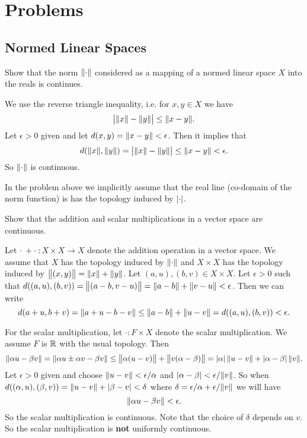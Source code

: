 \section{Problems}
\subsection{Normed Linear Spaces}
\begin{problem}
	Show that the norm $ \norm{\cdot} $ considered as a mapping of a normed linear space $ X $ into the reals is continues.
\end{problem}

\begin{solution}
	We use the reverse triangle inequality, i.e. for $ x,y \in X $ we have
	\[ \left|\norm{x} - \norm{y}\right| \leq \norm{x-y}. \]
	Let $ \epsilon>0 $ given and let $ d(x,y)=\norm{x-y}<\epsilon $. Then it implies that
	\[ d(\norm{x},\norm{y}) = \left|\norm{x} - \norm{y}\right| \leq \norm{x-y} <\epsilon. \]
	So $ \norm{\cdot} $ is continuous.
\end{solution}
\begin{remark}
	In the problem above we implicitly assume that the real line (co-domain of the norm function) is has the topology induced by $ \left|\cdot\right| $.
\end{remark}

\begin{problem}
	Show that the addition and scalar multiplications in a vector space are continuous.
\end{problem}
\begin{solution}
	Let $ \cdot\ + \cdot\ : X\times X \to X $ denote the addition operation in a vector space. We assume that $ X $ has the topology induced by $ \norm{\cdot} $ and $ X\times X $ has the topology induced by $ \norm{(x,y)} = \norm{x} + \norm{y} $. Let $ (a,u),(b,v)\in X\times X $. Let $ \epsilon>0 $ such that $ d((a,u),(b,v)) = \norm{(a-b,v-u)} = \norm{a-b} + \norm{v-u} < \epsilon $. Then we can write
	\[ d(a+u,b+v) = \norm{a+u-b-v} \leq \norm{a-b}+\norm{u-v} = d((a,u),(b,v))<\epsilon. \]
	
	For the scalar multiplication, let $ \cdot: F\times X $ denote the scalar multiplication. We assume $ F $ is $ \mathbb{R} $ with the usual topology. Then 
	\[ \norm{\alpha u - \beta v} = \norm{\alpha u \pm \alpha v - \beta v} \leq \norm{\alpha(u-v)} + \norm{v(\alpha-\beta)} = \left|\alpha\right|\norm{u-v} + \left|\alpha-\beta\right|\norm{v}. \]
	Let $ \epsilon >0 $ given and choose $ \norm{u-v} < \epsilon/\alpha $ and $ \left|\alpha-\beta\right|<\epsilon/\norm{v} $. So when $ d((\alpha,u),(\beta,v)) = \norm{u-v}+\left|\beta-v\right| < \delta $ where $ \delta = \epsilon/\alpha + \epsilon/\norm{v} $ we will have
	\[ \norm{\alpha u - \beta v} < \epsilon. \] 
	So the scalar multiplication is continuous. Note that the choice of $ \delta $ depends on $ v $. So the scalar multiplication is \textbf{not} uniformly continuous.
\end{solution}


